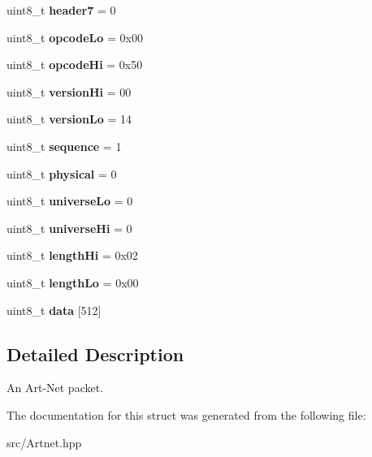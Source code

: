 \begin{DoxyCompactItemize}
\item 
\mbox{\label{structArtnet_1_1ArtNetPacket_ad4f533e188b56c26caa521dc67e1fcec}} 
uint8\+\_\+t {\bfseries header7} = 0
\item 
\mbox{\label{structArtnet_1_1ArtNetPacket_a7b97490b76512f800e0f370a2c1317fa}} 
uint8\+\_\+t {\bfseries opcode\+Lo} = 0x00
\item 
\mbox{\label{structArtnet_1_1ArtNetPacket_aa66381b0754cfac0ad68a2d1632ac134}} 
uint8\+\_\+t {\bfseries opcode\+Hi} = 0x50
\item 
\mbox{\label{structArtnet_1_1ArtNetPacket_af10c66bcb9a4ab7d4f84657241833113}} 
uint8\+\_\+t {\bfseries version\+Hi} = 00
\item 
\mbox{\label{structArtnet_1_1ArtNetPacket_a0a12882d959a2be50206f3b12050d9d0}} 
uint8\+\_\+t {\bfseries version\+Lo} = 14
\item 
\mbox{\label{structArtnet_1_1ArtNetPacket_a78157adb70a494456d9fce018d465116}} 
uint8\+\_\+t {\bfseries sequence} = 1
\item 
\mbox{\label{structArtnet_1_1ArtNetPacket_a2f5f981d5841a312a1623b78b114438e}} 
uint8\+\_\+t {\bfseries physical} = 0
\item 
\mbox{\label{structArtnet_1_1ArtNetPacket_a78f5d608f6810f7770a59e56d2213fee}} 
uint8\+\_\+t {\bfseries universe\+Lo} = 0
\item 
\mbox{\label{structArtnet_1_1ArtNetPacket_a7a740fd2053a3ef14d268c3a5c5184fb}} 
uint8\+\_\+t {\bfseries universe\+Hi} = 0
\item 
\mbox{\label{structArtnet_1_1ArtNetPacket_aa504b1b621db47a0678655e13d37d426}} 
uint8\+\_\+t {\bfseries length\+Hi} = 0x02
\item 
\mbox{\label{structArtnet_1_1ArtNetPacket_a2079f7f81420327fc4c369539ab55ecc}} 
uint8\+\_\+t {\bfseries length\+Lo} = 0x00
\item 
\mbox{\label{structArtnet_1_1ArtNetPacket_a08fe2abb7d39d4915dab44ca0d54f641}} 
uint8\+\_\+t {\bfseries data} \mbox{[}512\mbox{]}
\end{DoxyCompactItemize}


\subsection{Detailed Description}
An Art-\/\+Net packet. 

The documentation for this struct was generated from the following file\+:\begin{DoxyCompactItemize}
\item 
src/Artnet.\+hpp\end{DoxyCompactItemize}
